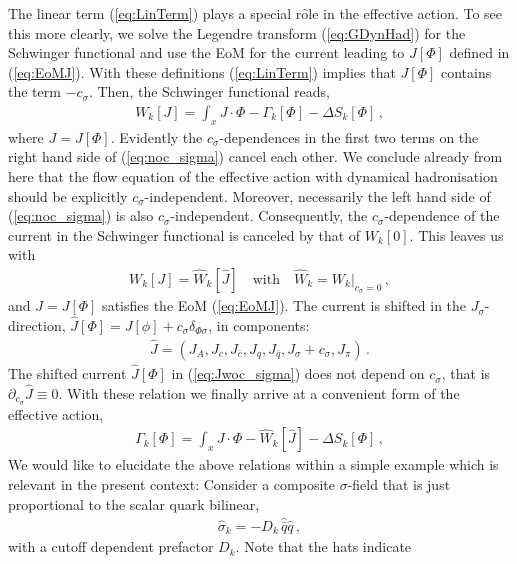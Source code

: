 \documentclass[%
reprint,
superscriptaddress,
showpacs,preprintnumbers,
 amsmath,amssymb,
 aps,
prd,
]{revtex4-1}
\def\eq#1{(\ref{#1})}
\begin{document}
The linear term \eq{eq:LinTerm} plays a special r$\hat{\textrm{o}}$le
in the effective action. To see this more clearly, we solve the
Legendre transform \eq{eq:GDynHad} for the Schwinger functional and
use the EoM for the current leading to $J[\Phi]$ defined in
\eq{eq:EoMJ}. With these definitions \eq{eq:LinTerm} implies that
$J[\Phi]$ contains the term $- c_\sigma$. Then, the Schwinger
functional reads,
%
\begin{align}\label{eq:noc_sigma}
  W_k[J ] = \int_ x J\cdot \Phi - \Gamma_k[\Phi]
  - \Delta S_k[\Phi]\,, 
\end{align}
%
where $J=J[\Phi]$. Evidently the $c_\sigma$-dependences in the first
two terms on the right hand side of \eq{eq:noc_sigma} cancel each
other. We conclude already from here that the flow equation of the
effective action with dynamical hadronisation should be explicitly
$c_\sigma$-independent. Moreover, necessarily the left hand side of
\eq{eq:noc_sigma} is also $c_\sigma$-independent.  Consequently, the
$c_\sigma$-dependence of the current in the Schwinger functional is
canceled by that of $W_k[0]$. This leaves us with
%
\begin{align}\label{eq:Wwoc_sigma}
  W_k[J] = \widehat{W}_k[\hat J] \quad\textrm{with}\quad
  \widehat W_{k}=\left.W_{k}\right|_{c_\sigma=0}  \,,
\end{align}
%
and $J=J[\Phi]$ satisfies the EoM \eq{eq:EoMJ}. The current is shifted
in the $J_\sigma$-direction,
$\hat J[\Phi]=J[\phi]+c_\sigma \delta_{\Phi \sigma}$, in
components: 
% 
\begin{align}\label{eq:Jwoc_sigma}
 \hat J=(J_A, J_c,J_{\bar c}, J_q,J_{\bar q}, J_\sigma
+c_\sigma, J_\pi)\,. 
\end{align}
%
The shifted current $\hat J[\Phi]$ in \eq{eq:Jwoc_sigma} does not
depend on $c_\sigma$, that is $\partial_{c_\sigma} \hat J\equiv
0$. With these relation we finally arrive at a convenient form of the
effective action,
% 
\begin{align}\label{eq:GDynHadfin}
 \Gamma_k[\Phi]=  \int_x J \cdot \Phi - \widehat W_{k}[\hat J]  -
  \Delta S_k[\Phi]
  \,,  
\end{align}
We would like to elucidate the above relations within a simple example
which is relevant in the present context: Consider a composite
$\sigma$-field that is just proportional to the scalar quark bilinear,
%
\begin{align} \label{eq:hatsigma-Example}
  \hat\sigma_k =- D_k \,\hat{\bar q} \hat q\,,
\end{align}
%
with a cutoff dependent prefactor $D_k$. Note that the hats indicate
\end{document}

